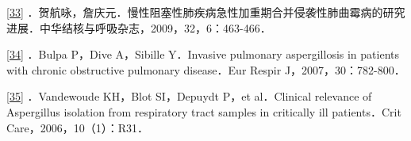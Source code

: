 \protect\hyperlink{text00012.htmlux5cux23ch33-11-back}{{[}33{]}}
．贺航咏，詹庆元．慢性阻塞性肺疾病急性加重期合并侵袭性肺曲霉病的研究进展．中华结核与呼吸杂志，2009，32，6：463-466．

\protect\hyperlink{text00012.htmlux5cux23ch34-11-back}{{[}34{]}} ．Bulpa
P，Dive A，Sibille Y．Invasive pulmonary aspergillosis in patients with
chronic obstructive pulmonary disease．Eur Respir J，2007，30：782-800．

\protect\hyperlink{text00012.htmlux5cux23ch35-11-back}{{[}35{]}}
．Vandewoude KH，Blot SI，Depuydt P，et al．Clinical relevance of
Aspergillus isolation from respiratory tract samples in critically ill
patients．Crit Care，2006，10（1）：R31．

\protect\hypertarget{text00013.html}{}{}

